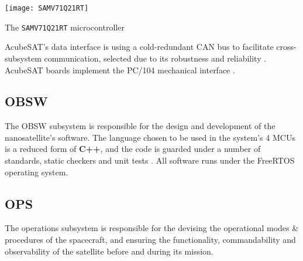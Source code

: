 \documentclass[a4paper,nobib,final]{tufte-book}
\begin{document}
\begin{marginfigure}
	\centering
	\texttt{[image: SAMV71Q21RT]}
	\caption{The \texttt{SAMV71Q21RT} microcontroller}
	\label{fig:samv71}
\end{marginfigure}

AcubeSAT's data interface is using a cold-redundant \ac{CAN} bus to facilitate cross-subsystem communication, selected due to its robustness and reliability \autocite{bouwmeester_survey_implementation_2017}. AcubeSAT boards implement the PC/104 mechanical interface \autocite{PC104}.

\subsection{\acf{OBSW}}

The \ac{OBSW} subsystem is responsible for the design and development of the nanosatellite's software. The language chosen to be used in the system's 4 \acp{MCU} is a reduced form of \textbf{C++}, and the code is guarded under a number of standards, static checkers and unit tests \autocite{DDJF_OBSW}. All software runs under the Free\acs{RTOS} operating system.



\subsection{\acf{OPS}}

The operations subsystem is responsible for the devising the operational modes \& procedures of the spacecraft, and ensuring the functionality, commandability and observability of the satellite before and during its mission.
\end{document}
